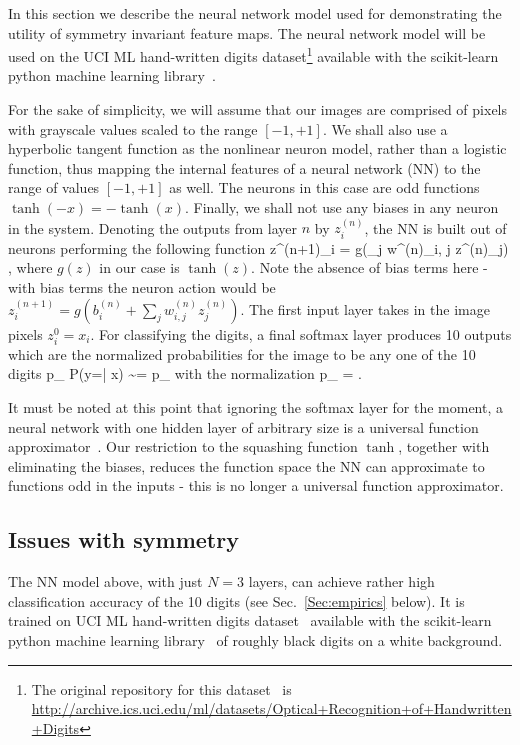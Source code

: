 \documentclass{svproc}
\begin{document}
In this section we describe the neural network model used for demonstrating the utility of symmetry invariant feature maps. The neural network model will be used on the UCI ML hand-written digits dataset\footnote{The original repository for this dataset~\cite{Dua:2017} is \url{http://archive.ics.uci.edu/ml/datasets/Optical+Recognition+of+Handwritten+Digits}} available with the scikit-learn python machine learning library~\cite{scikit-learn}.

For the sake of simplicity, we will assume that our images are comprised of pixels with grayscale values scaled to the range $[-1,+1]$. We shall also use a hyperbolic tangent function as the nonlinear neuron model, rather than a logistic function, thus mapping the internal features of a neural network (NN) to the range of values $[-1, +1]$ as well. The neurons in this case are odd functions $\tanh(-x) = - \tanh(x)$. Finally, we shall not use any biases in any neuron in the system. Denoting the outputs from layer $n$ by $z^{(n)}_i$, the NN is built out of neurons performing the following function
\be
z^{(n+1)}_i = g\left(\sum_j w^{(n)}_{i, j} z^{(n)}_j\right)
\; ,
\ee
where $g(z)$ in our case is $\tanh(z)$. Note the absence of bias terms here - with bias terms the neuron action would be 
$ z^{(n+1)}_i = g\left(b^{(n)}_i + \sum_j w^{(n)}_{i, j} z^{(n)}_j\right) $. The first input layer takes in the image pixels $z^0_i = x_i$. For classifying the digits, a final softmax layer produces 10 outputs which are the normalized probabilities for the image to be any one of the 10 digits
\be\label{softmax_1}
p_{\alpha} \equiv P(y=\alpha | x) \sim \exp{} = {\tilde p}_{\alpha}
\ee
with the normalization
\be\label{softmax_2}
p_{\alpha} = 
\; .
\ee

It must be noted at this point that ignoring the softmax layer for the moment, a neural network with one hidden layer of arbitrary size is a universal function approximator~\cite{hornik1989multilayer}. Our restriction to the squashing function $\tanh$, together with eliminating the biases, reduces the function space the NN can approximate to functions odd in the inputs - this is no longer a universal function approximator.

\subsection{Issues with symmetry}

The NN model above, with just $N=3$ layers, can achieve rather high classification accuracy of the 10 digits (see Sec.~\ref{Sec:empirics} below).
It is trained on UCI ML hand-written digits dataset~\cite{Dua:2017} available with the scikit-learn python machine learning library~\cite{scikit-learn} of roughly black digits on a white background.
\end{document}

